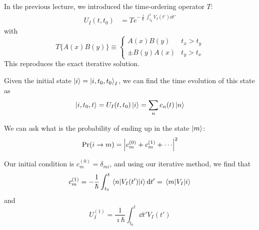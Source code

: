 \documentclass[a4paper,twoside,master.tex]{subfiles}
\begin{document}

In the previous lecture, we introduced the time-ordering operator $ T $:
\begin{align}
    U_I(t, t_0) &= T e^{- \frac{\imath}{\hbar} \int_{t_0}^t V_I(t') \dd{t'}}
\end{align}
with
\begin{equation}
    T \{A(x) B(y)\} \equiv \begin{cases} A(x) B(y) & t_x > t_y \\ \pm B(y) A(x) & t_y > t_x \end{cases}
\end{equation}
This reproduces the exact iterative solution.


Given the initial state $\ket{i} =\ket{i, t_0, t_0}_I $, we can find the time evolution of this state as
\begin{equation}
    \ket{i, t_0, t} = U_I(t, t_0)\ket{i} = \sum_n c_n(t)\ket{n}
\end{equation}

We can ask what is the probability of ending up in the state $\ket{m} $:
\begin{equation}
    \Pr(i \to m) = \abs{c_m^{(0)} + c_m^{(1)} + \cdots}^2
\end{equation}

Our initial condition is $ c_m^{(0)} = \delta_{mi} $, and using our iterative method, we find that
\begin{equation}
    c_m^{(1)} = - \frac{1}{\hbar} \int_{t_0}^{t} \mel{n}{V_I(t')}{i} \dd{t'} = \mel{m}{V_I}{i}
\end{equation}
and
\begin{equation}
    U_I^{(1)} = \frac{1}{\imath \hbar} \int_{t_0}^t \dd{t'} V_I(t') 
\end{equation}
\end{document}
